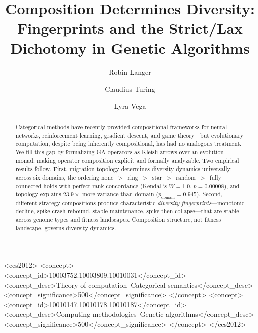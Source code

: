\documentclass[dvipsnames,format=sigconf,anonymous=false,review=false]{acmart}
\begin{document}
\title{Composition Determines Diversity: Fingerprints and the Strict/Lax Dichotomy in Genetic Algorithms}

\author{Robin Langer}

\author{Claudius Turing}

\author{Lyra Vega}

\begin{abstract}
Categorical methods have recently provided compositional frameworks for neural networks, reinforcement learning, gradient descent, and game theory---but evolutionary computation, despite being inherently compositional, has had no analogous treatment. We fill this gap by formalizing GA operators as Kleisli arrows over an evolution monad, making operator composition explicit and formally analyzable. Two empirical results follow. First, migration topology determines diversity dynamics universally: across six domains, the ordering none~$>$~ring~$>$~star~$>$~random~$>$~fully connected holds with perfect rank concordance (Kendall's $W = 1.0$, $p = 0.00008$), and topology explains $23.9\times$ more variance than domain ($p_{\mathrm{domain}} = 0.945$). Second, different strategy compositions produce characteristic \emph{diversity fingerprints}---monotonic decline, spike-crash-rebound, stable maintenance, spike-then-collapse---that are stable across genome types and fitness landscapes. Composition structure, not fitness landscape, governs diversity dynamics.
\end{abstract}

\begin{CCSXML}
<ccs2012>
<concept>
<concept_id>10003752.10003809.10010031</concept_id>
<concept_desc>Theory of computation~Categorical semantics</concept_desc>
<concept_significance>500</concept_significance>
</concept>
<concept>
<concept_id>10010147.10010178.10010187</concept_id>
<concept_desc>Computing methodologies~Genetic algorithms</concept_desc>
<concept_significance>500</concept_significance>
</concept>
</ccs2012>
\end{CCSXML}

\end{document}
